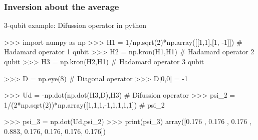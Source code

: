 \begin{frame}[fragile]{}
	\frametitle{Inversion about the average}
	\begin{exampleblock}{3-qubit example: Difussion operator in python}
		\vspace*{0.5cm}
		\begin{adjustbox}{max width=0.9\textwidth}
			\begin{python}
>>> import numpy as np
>>> H1 = 1/np.sqrt(2)*np.array([[1,1],[1, -1]]) # Hadamard operator 1 qubit
>>> H2 = np.kron(H1,H1) # Hadamard operator 2 qubit
>>> H3 = np.kron(H2,H1) # Hadamard operator 3 qubit

>>> D = np.eye(8) # Diagonal operator
>>> D[0,0] = -1

>>> Ud = -np.dot(np.dot(H3,D),H3) # Difussion operator
>>> psi_2 = 1/(2*np.sqrt(2))*np.array([1,1,1,-1,1,1,1,1]) # psi_2

>>> psi_3 = np.dot(Ud,psi_2)
>>> print(psi_3)
array([0.176 , 0.176 , 0.176 , 0.883, 0.176, 0.176, 0.176, 0.176])
			\end{python}
		\end{adjustbox}
	\end{exampleblock}

\end{frame}

